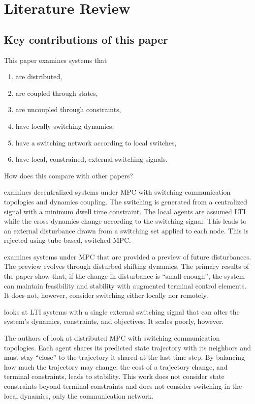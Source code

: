  \section{Literature Review}
 \subsection{Key contributions of this paper}
 This paper examines systems that
 \begin{enumerate}
 	\item are distributed,
 	\item are coupled through states,
 	\item are uncoupled through constraints,
 	\item have locally switching dynamics,
 	\item have a switching network according to local switches,
 	\item have local, constrained, external switching signals.
 \end{enumerate}
 How does this compare with other papers?

\cite{Ahandani2020} examines decentralized systems under MPC with switching communication topologies and dynamics coupling. The switching is generated from a centralized signal with a minimum dwell time constraint. The local agents are assumed LTI while the cross dynamics change according to the switching signal. This leads to an external disturbance drawn from a switching set applied to each node. This is rejected using tube-based, switched MPC. 

\cite{Monasterios2019} examines systems under MPC that are provided a preview of future disturbances. The preview evolves through disturbed shifting dynamics. The primary results of the paper show that, if the change in disturbance is ``small enough'', the system can maintain feasibility and stability with augmented terminal control elements. It does not, however, consider switching either locally nor remotely. 

\cite{Danielson2019} looks at LTI systems with a single external switching signal that can alter the system's dynamics, constraints, and objectives. It scales poorly, however.

The authors of \cite{Li2020} look at distributed MPC with switching communication topologies. Each agent shares its predicted state trajectory with its neighbors and must stay ``close'' to the trajectory it shared at the last time step. By balancing how much the trajectory may change, the cost of a trajectory change, and terminal constraints, leads to stability. This work does not consider state constraints beyond terminal constraints and does not consider switching in the local dynamics, only the communication network. 